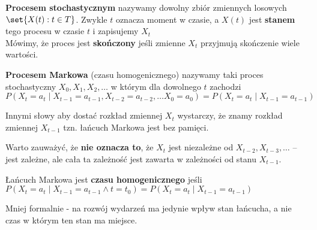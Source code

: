 \begin{definition}
    \textbf{Procesem stochastycznym} nazywamy dowolny zbiór zmiennych losowych \(\set{X(t) : t \in T}\).
    Zwykle \(t\) oznacza moment w czasie, a \(X(t)\) jest \textbf{stanem} tego procesu w czasie \(t\) i zapisujemy \(X_t\) \\
    Mówimy, że proces jest \textbf{skończony} jeśli zmienne \(X_t\) przyjmują skończenie wiele wartości.
\end{definition}

\begin{definition}
    \textbf{Procesem Markowa} (czasu homogenicznego) nazywamy taki proces stochastyczny \(X_0, X_1, X_2, \dots\) w którym dla dowolnego \(t\) zachodzi
    \[ 
        P(X_t = a_t \mid X_{t-1} = a_{t-1}, X_{t-2} = a_{t-2}, \dots X_0 = a_0) =
        P(X_t = a_t \mid X_{t-1} = a_{t-1}) 
    \]
\end{definition}

Innymi słowy aby dostać rozkład zmiennej \(X_t\) wystarczy, że znamy rozkład zmiennej \(X_{t-1}\) tzn. łańcuch Markowa jest bez pamięci.

Warto zauważyć, że \textbf{nie oznacza to}, że \(X_t\) jest niezależne od \(X_{t-2}, X_{t-3}, \dots\) --
jest zależne, ale cała ta zależność jest zawarta w zależności od stanu \(X_{t-1}\).

\begin{definition}
    Łańcuch Markowa jest \textbf{czasu homogenicznego} jeśli \(
    P(X_t = a_t \mid X_{t-1} = a_{t-1} \land t = t_0) = P(X_t = a_t \mid X_{t-1} = a_{t-1})
    \)
\end{definition}
Mniej formalnie - na rozwój wydarzeń ma jedynie wpływ stan łańcucha, a nie czas w którym ten stan ma miejsce.
